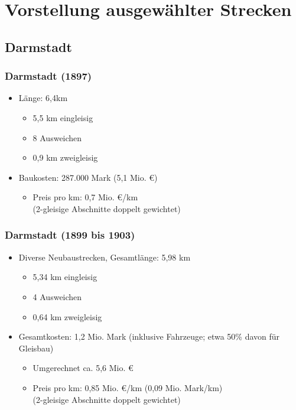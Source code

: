 \documentclass[xcolor=dvipsnames]{beamer}
\begin{document}
\section{Vorstellung ausgewählter Strecken}

\subsection{Darmstadt}
\begin{frame}
  \frametitle{Darmstadt (1897)}

  \begin{itemize}
  \item Länge: 6,4km
    \begin{itemize}
    \item 5,5 km eingleisig
    \item 8 Ausweichen
    \item 0,9 km zweigleisig
    \end{itemize}
  \item Baukosten: 287.000 Mark (5,1 Mio. €)
    \begin{itemize}
    \item Preis pro km: 0,7 Mio. €/km\\
      (2-gleisige Abschnitte doppelt gewichtet)
    \end{itemize}
  \end{itemize}
\end{frame}


\begin{frame}
  \frametitle{Darmstadt (1899 bis 1903)}

  \begin{itemize}
  \item Diverse Neubaustrecken, Gesamtlänge: 5,98 km
    \begin{itemize}
    \item 5,34 km eingleisig
    \item 4 Ausweichen
    \item 0,64 km zweigleisig
    \end{itemize}
  \item Gesamtkosten: 1,2 Mio. Mark (inklusive Fahrzeuge; etwa 50\%
    davon für Gleisbau)
    \begin{itemize}
    \item Umgerechnet ca. 5,6 Mio. €
    \item Preis pro km: 0,85 Mio. €/km (0,09 Mio. Mark/km)\\
      (2-gleisige Abschnitte doppelt gewichtet)
    \end{itemize}
  \end{itemize}
\end{frame}
\end{document}
